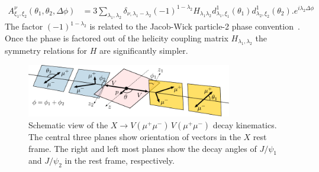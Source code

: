 \documentclass[prd,preprintnumbers,floatfix,
nofootinbib,superscriptaddress]{revtex4}
\begin{document}
\begin{align}
  A^{\nu}_{\xi_1,\xi_2}(\theta_1,\theta_2,\Delta\phi) &= 3
  \sum_{\lambda_1,\lambda_2}
  \delta_{\nu,\lambda_1-\lambda_2} (-1)^{1-\lambda_2}
  H_{\lambda_1\lambda_2}
  d_{\lambda_1,\xi_1}^{1}(\theta_1) d_{\lambda_2,\xi_2}^{1}(\theta_2).
  e^{i\lambda_2 \Delta\phi}
\end{align}
The factor $(-1)^{1-\lambda_2}$ is related to the Jacob-Wick particle-2 phase convention~\cite{Jacob:1959at}.
Once the phase is factored out of the helicity coupling matrix $H_{\lambda_1,\lambda_2}$
the symmetry relations for $H$ are significantly simpler.
\begin{figure}
  \includegraphics[width=0.8\textwidth]{../plots/angles.pdf}
  \caption{Schematic view of the $X\to V(\mu^+\mu^-)\,V(\mu^+\mu^-)$ decay kinematics.
  The central three planes show orientation of vectors in the $X$ rest frame.
  The right and left most planes show the decay angles of $J/\psi_1$ and $J/\psi_2$ in the rest frame, respectively.
  }
  \label{fig:decay}
\end{figure}


\end{document}
